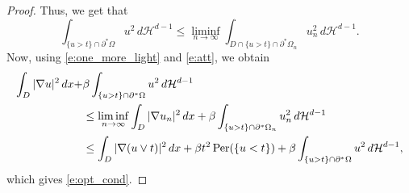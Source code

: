 \documentclass[JEP,XML,SOM,Unicode]{cedram}
\newcommand{\Per}{\mathrm{Per}}
\theoremstyle{plain}
\theoremstyle{definition}
\def\HH{\mathcal{H}}
\begin{document}
\begin{proof}
Thus, we get that
\begin{equation}\label{e:one_more_light}
\int_{\{u>t\}\cap \partial^\ast\Omega}u^2\,d\HH^{d-1}\le \liminf_{n\to\infty}\int_{D\cap\{u>t\}\cap \partial^\ast\Omega_{n}}u_{n}^2\,d\HH^{d-1}.
\end{equation}
Now, using \eqref{e:one_more_light} and \eqref{e:att}, we obtain
\begin{align}
\int_{D}|\nabla u|^2\,dx+&\beta\int_{\{u> t\}\cap \partial^\ast\Omega}u^2\,d\HH^{d-1}\notag\\
&\le \liminf_{n\to\infty}\int_{D}|\nabla u_{n}|^2\,dx+\beta\int_{\{u> t\}\cap \partial^\ast\Omega_{n}}u_{n}^2\,d\HH^{d-1}\notag\\
&\le \int_{D}|\nabla (u\vee t)|^2\,dx+\beta t^2\, \Per(\{u<t\})+\beta\int_{\{u> t\}\cap \partial^\ast\Omega}u^2\,d\HH^{d-1},\notag
\end{align}
which gives \eqref{e:opt_cond}.
\end{proof}
\end{document}
